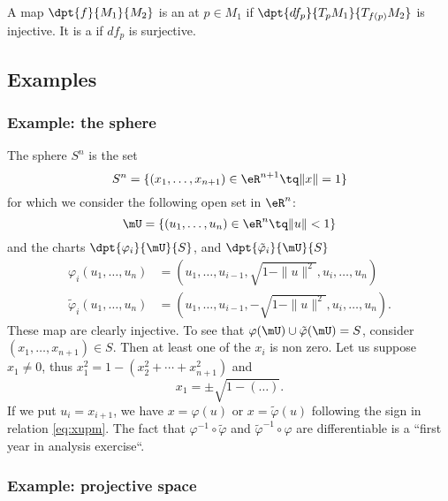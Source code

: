 \begin{definition}
    A map $\dpt{f}{M_1}{M_2}$ is an  at $p\in M_1$ if $\dpt{df_p}{T_pM_1}{T_{f(p)}M_2}$ is injective. It is a  if $df_p$ is surjective.
\end{definition}

\subsection{Examples}

\subsubsection{Example: the sphere}

The sphere $S^n$ is the set
\[
  S^n=\{  (x_1,\ldots, x_{n+1})\in\eR^{n+1}\tq \|x\|=1  \}
\]
for which we consider the following open set in $\eR^n$:
\[
   \mU=\{  (u_1,\ldots,u_n)\in\eR^n\tq\|u\|<1  \}
\]
and the charts $\dpt{\varphi_i}{\mU}{S}$, and $\dpt{\tilde{\varphi}_i}{\mU}{S}$
\begin{subequations}
\begin{align}
   \varphi_i(u_1,\ldots,u_n)&=(u_1,\ldots,u_{i-1}, \sqrt{  1-\|u\|^2  },u_i,\ldots,u_n )\\
   \tilde{\varphi}_i(u_1,\ldots,u_n)&=(u_1,\ldots,u_{i-1}, -\sqrt{  1-\|u\|^2  },u_i,\ldots,u_n ).
\end{align}
\end{subequations}
These map are clearly injective. To see that $\varphi(\mU)\cup\tilde{\varphi}(\mU)=S$, consider $(x_1,\ldots,x_{n+1})\in S$. Then at least one of the $x_i$ is non zero. Let us suppose $x_1\neq 0$, thus $x_1^2=1-(x_2^2+\cdots+x_{n+1}^2)$ and
\begin{equation}\label{eq:xupm}
   x_1=\pm\sqrt{1-(\ldots)}.
\end{equation}
If we put $u_i=x_{i+1}$, we have $x=\varphi(u)$ or $x=\tilde{\varphi}(u)$ following the sign in relation \eqref{eq:xupm}. The fact that $\varphi^{-1}\circ\tilde{\varphi}$ and $\tilde{\varphi}^{-1}\circ\varphi$ are differentiable is a ``first year in analysis exercise``.

\subsubsection{Example: projective space}

